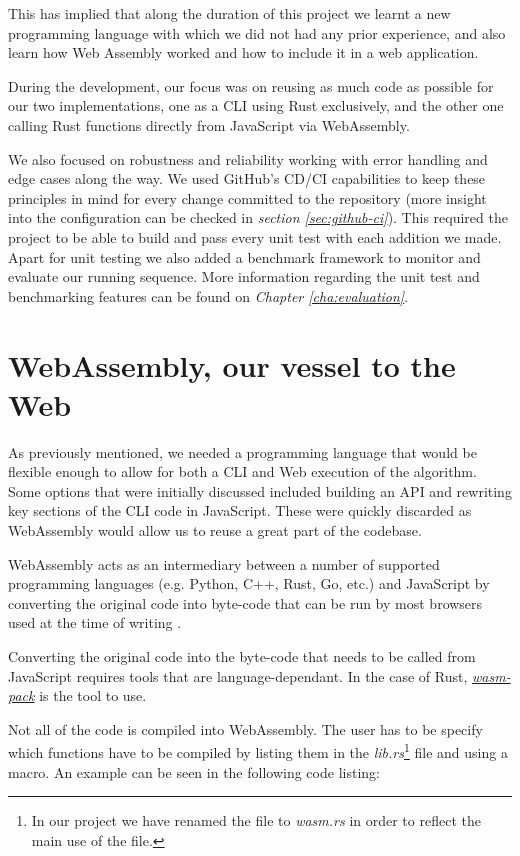 \documentclass[twoside,openright,titlepage,numbers=noenddot,headinclude,%
                footinclude=true,cleardoublepage=empty,abstractoff, %
                BCOR=5mm,paper=a4,fontsize=11pt,%
                ngerman,american,%
                ]{scrreprt}
\begin{document}
This has implied that along the duration of this project we learnt a new programming language with which we did not had any prior experience, and also learn how Web Assembly worked and how to include it in a web application.

During the development, our focus was on reusing as much code as possible for our two implementations, one as a CLI using Rust exclusively, and the other one calling Rust functions directly from JavaScript via WebAssembly.

We also focused on robustness and reliability working with error handling and edge cases along the way. We used GitHub's CD/CI capabilities to keep these principles in mind for every change committed to the repository (more insight into the configuration can be checked in \textit{section \ref{sec:github-ci}}). This required the project to be able to build and pass every unit test with each addition we made. Apart for unit testing we also added a benchmark framework to monitor and evaluate our running sequence. More information regarding the unit test and benchmarking features can be found on \textit{Chapter \ref{cha:evaluation}}.

\section{WebAssembly, our vessel to the Web}
As previously mentioned, we needed a programming language that would be flexible enough to allow for both a CLI and Web execution of the algorithm. Some options that were initially discussed included building an API and rewriting key sections of the CLI code in JavaScript. These were quickly discarded as WebAssembly would allow us to reuse a great part of the codebase.

WebAssembly acts as an intermediary between a number of supported programming languages (e.g. Python, C++, Rust, Go, etc.) and JavaScript by converting the original code into byte-code that can be run by most browsers used at the time of writing \cite{mdn-wasm}.

Converting the original code into the byte-code that needs to be called from JavaScript requires tools that are language-dependant. In the case of Rust, \href{https://github.com/rustwasm/wasm-pack}{\textit{wasm-pack}} is the tool to use.

Not all of the code is compiled into WebAssembly. The user has to be specify which functions have to be compiled by listing them in the \textit{lib.rs}\footnote{In our project we have renamed the file to \textit{wasm.rs} in order to reflect the main use of the file.} file and using a macro. An example can be seen in the following code listing:
\end{document}
